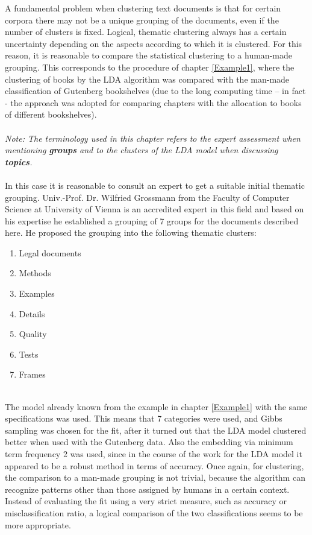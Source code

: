 \documentclass[11pt,a4paper]{article}
\begin{document}
A fundamental problem when clustering text documents is that for certain corpora there may not be a unique grouping of the documents, even if the number of clusters is fixed. Logical, thematic clustering always has a certain uncertainty depending on the aspects according to which it is clustered. For this reason, it is reasonable to compare the statistical clustering to a human-made grouping. This corresponds to the procedure of chapter \ref{Example1}, where the clustering of books by the LDA algorithm was compared with the man-made classification of Gutenberg bookshelves (due to the long computing time – in fact - the approach was adopted for comparing chapters with the allocation to books of different bookshelves).\\
\ \\
\textit{Note: The terminology used in this chapter refers to the expert assessment when mentioning \textbf{groups} and to the clusters of the LDA model when discussing \textbf{topics}.}\\
\ \\
In this case it is reasonable to consult an expert to get a suitable initial thematic grouping. Univ.-Prof. Dr. Wilfried Grossmann from the Faculty of Computer Science at University of Vienna is an accredited expert in this field and based on his expertise he established a grouping of 7 groups for the documents described here. He proposed the grouping into the following thematic clusters: 
\begin{enumerate}
	\item Legal documents
	\item Methods
	\item Examples
	\item Details
	\item Quality
	\item Tests
	\item Frames
\end{enumerate}
\ \\
The model already known from the example in chapter \ref{Example1} with the same specifications was used. This means that 7 categories were used, and Gibbs sampling was chosen for the fit, after it turned out that the LDA model clustered better when used with the Gutenberg data. Also the embedding via minimum term frequency 2 was used, since in the course of the work for the LDA model it appeared to be a robust method in terms of accuracy. Once again, for clustering, the comparison to a man-made grouping is not trivial, because the algorithm can recognize patterns other than those assigned by humans in a certain context. Instead of evaluating the fit using a very strict measure, such as accuracy or misclassification ratio, a logical comparison of the two classifications seems to be more appropriate.\\
\end{document}
